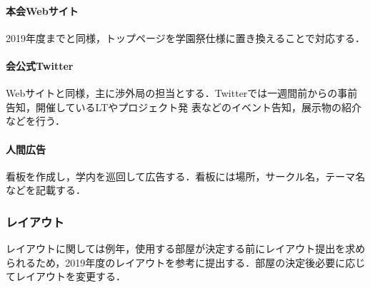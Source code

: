 \paragraph{本会Webサイト}
2019年度までと同様，トップページを学園祭仕様に置き換えることで対応する．
\paragraph{会公式Twitter}
Webサイトと同様，主に渉外局の担当とする．Twitterでは一週間前からの事前告知，開催しているLTやプロジェクト発
表などのイベント告知，展示物の紹介などを行う．
\paragraph{人間広告}
看板を作成し，学内を巡回して広告する．看板には場所，サークル名，テーマ名などを記載する．
\subsubsection*{レイアウト}
レイアウトに関しては例年，使用する部屋が決定する前にレイアウト提出を求められるため，2019年度のレイアウトを参考に提出する．部屋の決定後必要に応じてレイアウトを変更する．


